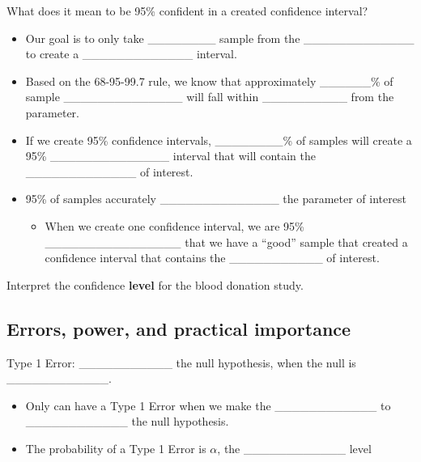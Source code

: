 \documentclass[
]{report}
\providecommand{\tightlist}{%
  \setlength{\itemsep}{0pt}\setlength{\parskip}{0pt}}
\begin{document}

What does it mean to be 95\% confident in a created confidence interval?

\begin{itemize}
\item
  Our goal is to only take \_\_\_\_\_\_\_\_ sample from the \_\_\_\_\_\_\_\_\_\_\_\_\_ to create a \_\_\_\_\_\_\_\_\_\_\_\_\_ interval.
\item
  Based on the 68-95-99.7 rule, we know that approximately \_\_\_\_\_\_\% of sample \_\_\_\_\_\_\_\_\_\_\_\_\_\_ will fall within \_\_\_\_\_\_\_\_\_\_ from the parameter.
\item
  If we create 95\% confidence intervals, \_\_\_\_\_\_\_\_\% of samples will create a 95\% \_\_\_\_\_\_\_\_\_\_\_\_\_\_ interval that will contain the \_\_\_\_\_\_\_\_\_\_\_\_\_ of interest.
\item
  95\% of samples accurately \_\_\_\_\_\_\_\_\_\_\_\_\_\_ the parameter of interest

  \begin{itemize}
  \tightlist
  \item
    When we create one confidence interval, we are 95\% \_\_\_\_\_\_\_\_\_\_\_\_\_\_\_\_ that we have a ``good'' sample that created a confidence interval that contains the \_\_\_\_\_\_\_\_\_\_\_ of interest.
  \end{itemize}
\end{itemize}


Interpret the confidence \textbf{level} for the blood donation study.

\vspace{0.5in}

\newpage

\hypertarget{errors-power-and-practical-importance}{%
\subsection*{Errors, power, and practical importance}\label{errors-power-and-practical-importance}}


Type 1 Error: \_\_\_\_\_\_\_\_\_\_\_ the null hypothesis, when the null is \_\_\_\_\_\_\_\_\_\_\_\_.

\begin{itemize}
\item
  Only can have a Type 1 Error when we make the \_\_\_\_\_\_\_\_\_\_\_\_ to \_\_\_\_\_\_\_\_\_\_\_\_ the null hypothesis.
\item
  The probability of a Type 1 Error is \(\alpha\), the \_\_\_\_\_\_\_\_\_\_\_\_ level
\end{itemize}
\end{document}
